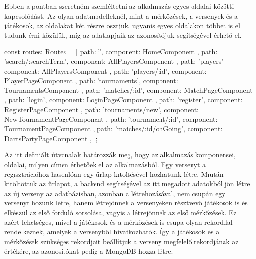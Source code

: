Ebben a pontban szeretném szemléltetni az alkalmazás egyes oldalai közötti kapcsolódást. Az olyan adatmodelleknél, mint a mérkőzések, a versenyek és a játékosok, az oldalakat két részre osztjuk, ugyanis egyes oldalakon többet is el tudunk érni közülük, míg az adatlapjaik az azonosítójuk segítségével érhető el.
\begin{cpp}
const routes: Routes = [
  { path: '', component: HomeComponent },
  { path: 'search/:searchTerm', component: AllPlayersComponent },
  { path: 'players', component: AllPlayersComponent },
  { path: 'players/:id', component: PlayerPageComponent },
  { path: 'tournaments', component: TournamentsComponent },
  { path: 'matches/:id', component: MatchPageComponent },
  { path: 'login', component: LoginPageComponent },
  { path: 'register', component: RegisterPageComponent },
  { path: 'tournaments/new', component: NewTournamentPageComponent },
  { path: 'tournament/:id', component: TournamentPageComponent },
  { path: 'matches/:id/onGoing', component: DartsPartyPageComponent },
];
\end{cpp}
Az itt definiált útvonalak határozzák meg, hogy az alkalmazás komponensei, oldalai, milyen címen érhetőek el az alkalmazásból.
Egy versenyt a regisztrációhoz hasonlóan egy űrlap kitöltésével hozhatunk létre. Miután kitöltöttük az űrlapot, a backend segítségével az itt megadott adatokból jön létre az új verseny az adatbázisban, azonban a létrehozásával, nem csupán egy versenyt hozunk létre, hanem létrejönnek a versenyeken résztvevő játékosok is és elkészül az első forduló sorsolása, vagyis a létrejönnek az első mérkőzések. Ez azért lehetséges, mivel a játékosok és a mérkőzések is csupa olyan rekorddal rendelkeznek, amelyek a versenyből hivatkozhatók. Így a játékosok és a mérkőzések szükséges rekordjait beállítjuk a verseny megfelelő rekordjának az értékére, az azonosítókat pedig a MongoDB hozza létre.

